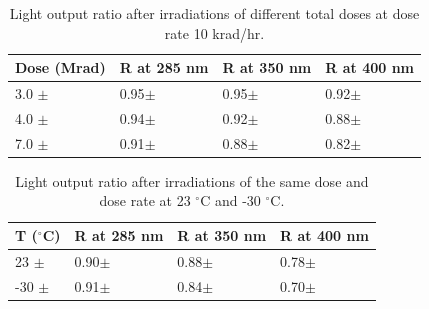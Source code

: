 \documentclass[preprint,12pt]{elsarticle}
\begin{document}
\begin{table}[!h]
\centering
  \caption{Light output ratio after irradiations of different total doses at dose rate 10 krad/hr.}
  \begin{tabular}{l|l|l|l}
    \hline
    Dose (Mrad)  & R at 285 nm	& R at 350 nm	& R at 400 nm    \\ \hline 
    3.0 $\pm$    & 0.95$\pm$	& 0.95$\pm$	& 0.92$\pm$   \\ \hline
    4.0 $\pm$    & 0.94$\pm$	& 0.92$\pm$	& 0.88$\pm$   \\ \hline
    7.0 $\pm$    & 0.91$\pm$	& 0.88$\pm$	& 0.82$\pm$   \\ 
    \hline
  \end{tabular}
  \label{table:2}
\end{table}

\begin{table}[!h]
\centering
  \caption{Light output ratio after irradiations of the same dose and dose rate at 23 $^\circ$C and -30 $^\circ$C.}
  \begin{tabular}{l|l|l|l}
    \hline
    T ($^\circ$C)  & R at 285 nm	& R at 350 nm	& R at 400 nm    \\ \hline 
    23  $\pm$    & 0.90$\pm$	& 0.88$\pm$	& 0.78$\pm$   \\ \hline
    -30 $\pm$    & 0.91$\pm$	& 0.84$\pm$	& 0.70$\pm$   \\ 
    \hline
  \end{tabular}
  \label{table:3}
\end{table}















\end{document}
